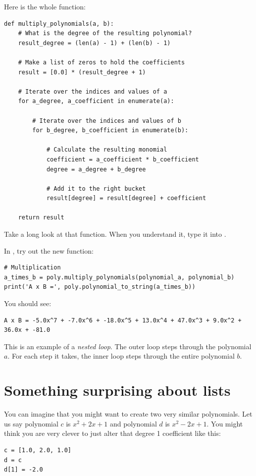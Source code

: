 Here is the whole function:
\begin{verbatim}
def multiply_polynomials(a, b):
    # What is the degree of the resulting polynomial?
    result_degree = (len(a) - 1) + (len(b) - 1)

    # Make a list of zeros to hold the coefficients
    result = [0.0] * (result_degree + 1)

    # Iterate over the indices and values of a
    for a_degree, a_coefficient in enumerate(a):

        # Iterate over the indices and values of b
        for b_degree, b_coefficient in enumerate(b):

            # Calculate the resulting monomial
            coefficient = a_coefficient * b_coefficient
            degree = a_degree + b_degree

            # Add it to the right bucket
            result[degree] = result[degree] + coefficient

    return result
\end{verbatim}

Take a long look at that function.  When you understand it, type it into .

In , try out the new function:
\begin{verbatim}
# Multiplication
a_times_b = poly.multiply_polynomials(polynomial_a, polynomial_b)
print('A x B =', poly.polynomial_to_string(a_times_b))
\end{verbatim}

You should see:
\begin{verbatim}
A x B = -5.0x^7 + -7.0x^6 + -18.0x^5 + 13.0x^4 + 47.0x^3 + 9.0x^2 + 36.0x + -81.0
\end{verbatim}

This is an example of a \emph{nested loop}. The outer loop steps
through the polynomial $a$. For each step it takes, the inner loop
steps through the entire polynomial $b$.

\section{Something surprising about lists}

You can imagine that you might want to create two very similar polynomials. Let us say polynomial $c$ is $x^2 + 2x + 1$ and polynomial $d$ is $x^2 -2x + 1$.  You might think you are very clever to just alter that degree 1 coefficient like this:
\begin{verbatim}
c = [1.0, 2.0, 1.0]
d = c
d[1] = -2.0
\end{verbatim}

